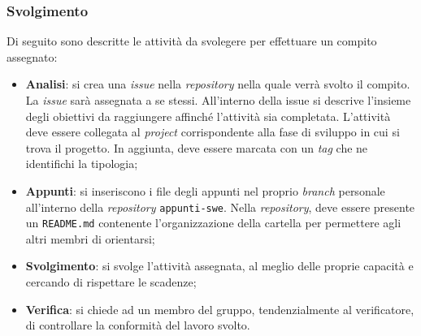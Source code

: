 \subsubsection{Svolgimento}
Di seguito sono descritte le attività da svolegere per effettuare un compito
assegnato:
\begin{itemize}
	\item \textbf{Analisi}: si crea una \textit{issue} nella \textit{repository}
	      nella quale verrà svolto il compito. La \textit{issue} sarà assegnata
	      a se stessi. All'interno della issue si descrive l'insieme degli
	      obiettivi da raggiungere affinché l'attività sia completata.
	      L'attività deve essere collegata al \textit{project} corrispondente
	      alla fase di sviluppo in cui si trova il progetto. In aggiunta, deve
	      essere marcata con un \textit{tag} che ne identifichi la tipologia;

	\item \textbf{Appunti}: si inseriscono i file degli
	      appunti nel proprio \textit{branch} personale all'interno
	      della \textit{repository} \texttt{appunti-swe}.
	      Nella \textit{repository}, deve essere presente un \texttt{README.md}
	      contenente l'organizzazione della cartella per permettere agli altri
	      membri di orientarsi;

	\item \textbf{Svolgimento}: si svolge l'attività assegnata, al meglio
	      delle proprie capacità e cercando di rispettare le scadenze;

	\item \textbf{Verifica}: si chiede ad un membro del gruppo,
	      tendenzialmente al verificatore, di controllare la conformità del
	      lavoro svolto.
\end{itemize}
